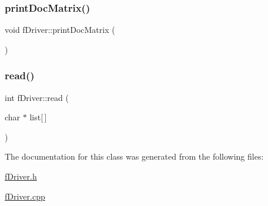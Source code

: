 \subsubsection{\texorpdfstring{print\+Doc\+Matrix()}{printDocMatrix()}}
{\footnotesize\ttfamily void f\+Driver\+::print\+Doc\+Matrix (\begin{DoxyParamCaption}{ }\end{DoxyParamCaption})}

\mbox{\label{classf_driver_ae1b18456f82da03bf23f7217507d40bd}} 
\subsubsection{\texorpdfstring{read()}{read()}}
{\footnotesize\ttfamily int f\+Driver\+::read (\begin{DoxyParamCaption}\item[{char $\ast$}]{list\mbox{[}$\,$\mbox{]} }\end{DoxyParamCaption})}



The documentation for this class was generated from the following files\+:\begin{DoxyCompactItemize}
\item 
\hyperlink{f_driver_8h}{f\+Driver.\+h}\item 
\hyperlink{f_driver_8cpp}{f\+Driver.\+cpp}\end{DoxyCompactItemize}
